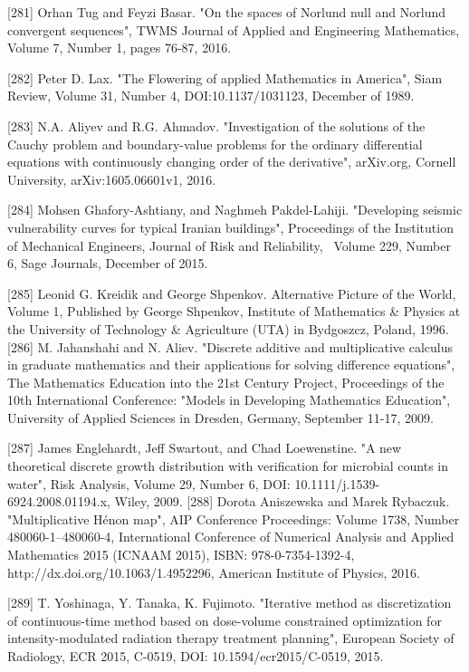 \documentclass[12pt]{article}
\begin{document}
[281] Orhan Tug and Feyzi Basar. "On the spaces of Norlund null and Norlund convergent sequences", TWMS Journal of Applied and Engineering Mathematics, Volume 7, Number 1, pages 76-87, 2016.

[282] Peter D. Lax. "The Flowering of applied Mathematics in America", Siam Review, Volume 31, Number 4, DOI:10.1137/1031123, December of 1989.

[283] N.A. Aliyev and R.G. Ahmadov. "Investigation of the solutions of the Cauchy problem and boundary-value problems for the ordinary differential equations with continuously changing order of the derivative", arXiv.org, Cornell University, arXiv:1605.06601v1, 2016.

[284] Mohsen Ghafory-Ashtiany, and Naghmeh Pakdel-Lahiji. "Developing seismic vulnerability curves for typical Iranian buildings", Proceedings of the Institution of Mechanical Engineers, Journal of Risk and Reliability,  Volume 229, Number 6, Sage Journals, December of 2015.

[285] Leonid G. Kreidik and George Shpenkov. Alternative Picture of the World, Volume 1, Published by George Shpenkov, Institute of Mathematics & Physics at the University of Technology & Agriculture (UTA) in Bydgoszcz, Poland, 1996.
[286] M. Jahanshahi and N. Aliev. "Discrete additive and multiplicative calculus in graduate mathematics and their applications for solving difference equations", The Mathematics Education into the 21st Century Project, Proceedings of the 10th International Conference: "Models in Developing Mathematics Education", University of Applied Sciences in Dresden, Germany, September 11-17, 2009.

[287] James Englehardt, Jeff Swartout, and Chad Loewenstine. "A new theoretical discrete growth distribution with verification for microbial counts in water", Risk Analysis, Volume 29, Number 6, DOI: 10.1111/j.1539-6924.2008.01194.x, Wiley, 2009.
[288] Dorota Aniszewska and Marek Rybaczuk. "Multiplicative Hénon map", AIP Conference Proceedings: Volume 1738, Number 480060-1–480060-4, International Conference of Numerical Analysis and Applied Mathematics 2015 (ICNAAM 2015), ISBN: 978-0-7354-1392-4, http://dx.doi.org/10.1063/1.4952296, American Institute of Physics, 2016.

[289] T. Yoshinaga, Y. Tanaka, K. Fujimoto. "Iterative method as discretization of continuous-time method based on dose-volume constrained optimization for intensity-modulated radiation therapy treatment planning", European Society of Radiology, ECR 2015, C-0519, DOI: 10.1594/ecr2015/C-0519, 2015.
\end{document}
